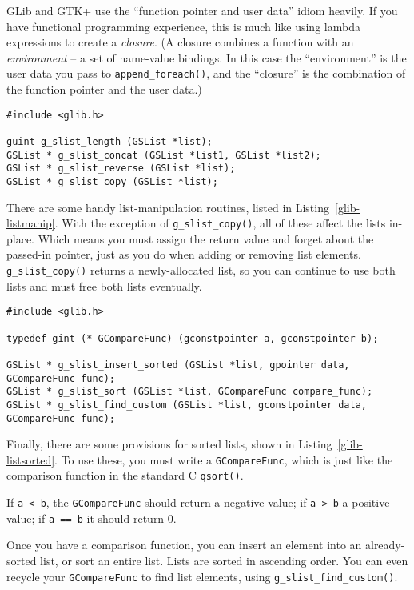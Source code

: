 GLib and GTK+ use the ``function pointer and user data'' idiom heavily. If you have functional programming experience, this  is much like using lambda expressions to create a \emph{closure}. (A closure combines a function with an \emph{environment} -- a set of name-value bindings. In this case the ``environment'' is the user data you pass to \lstinline{append_foreach()}, and the ``closure'' is the combination of the function pointer and the user data.)

\begin{lstlisting}[float, caption={Manipulating a linked list}, label=glib-listmanip]
#include <glib.h>

guint g_slist_length (GSList *list);
GSList * g_slist_concat (GSList *list1, GSList *list2);
GSList * g_slist_reverse (GSList *list);
GSList * g_slist_copy (GSList *list);
\end{lstlisting}

There are some handy list-manipulation routines, listed in Listing~\ref{glib-listmanip}. With the exception of \lstinline{g_slist_copy()}, all of these affect the lists in-place. Which means you must assign the return value and forget about the passed-in pointer, just as you do when adding or removing list elements. \lstinline{g_slist_copy()} returns a newly-allocated list, so you can continue to use both lists and must free both lists eventually.

\begin{lstlisting}[float, caption={Sorted lists}, label=glib-listsorted]
#include <glib.h>

typedef gint (* GCompareFunc) (gconstpointer a, gconstpointer b);

GSList * g_slist_insert_sorted (GSList *list, gpointer data, GCompareFunc func);
GSList * g_slist_sort (GSList *list, GCompareFunc compare_func);
GSList * g_slist_find_custom (GSList *list, gconstpointer data, GCompareFunc func);
\end{lstlisting}

Finally, there are some provisions for sorted lists, shown in Listing~\ref{glib-listsorted}. To use these, you must write a \lstinline{GCompareFunc}, which is just like the comparison function in the standard C \lstinline{qsort()}.

If \lstinline{a < b}, the \lstinline{GCompareFunc} should return a negative value; if \lstinline{a > b} a positive value; if \lstinline{a == b} it should return 0.

Once you have a comparison function, you can insert an element into an already-sorted list, or sort an entire list. Lists are sorted in ascending order. You can even recycle your \lstinline{GCompareFunc} to find list elements, using \lstinline{g_slist_find_custom()}.

